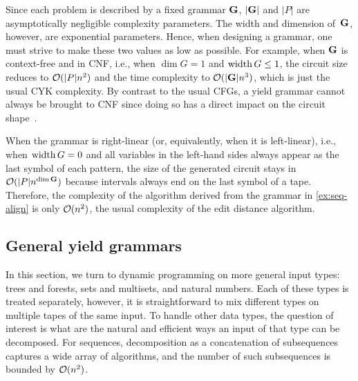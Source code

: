 Since each problem is described by a fixed grammar \(\gram\), \(|\gram|\) and \(|P|\) are asymptotically negligible complexity parameters.
The width and dimension of~\(\gram\), however, are exponential parameters.
Hence, when designing a grammar, one must strive to make these two values as low as possible.
For example, when \(\gram\) is context-free and in CNF, i.e., when \(\dim G = 1\) and \(\width G \le 1\),
the circuit size reduces to \(\bigo(|P| n^2)\)
and the time complexity to \(\bigo(|\gram| n^3)\),
which is just the usual CYK complexity.
By contrast to the usual CFGs, a yield grammar cannot always be brought to CNF since doing so has a direct impact on the circuit shape~\parencite[section~3.10]{Giegerich2004DisciplineDynamicProgramming}.

When the grammar is right-linear (or, equivalently, when it is left-linear), i.e.,
when \(\width G = 0\) and
all variables in the left-hand sides always appear as the last symbol of each pattern,
the size of the generated circuit stays in \(\bigo(|P|n^{\dim\gram})\)
because intervals always end on the last symbol of a tape.
Therefore, the complexity of the algorithm derived from the grammar in \cref{ex:seq-align} is only \(\bigo(n^2)\), the usual complexity of the edit distance algorithm.

\subsection{General yield grammars}

In this section, we turn to dynamic programming on more general input types: trees and forests, sets and multisets, and natural numbers.
Each of these types is treated separately, however, it is straightforward to mix different types on multiple tapes of the same input.
To handle other data types, the question of interest is what are the natural and efficient ways an input of that type can be decomposed.
For sequences, decomposition as a concatenation of subsequences captures a wide array of algorithms, and the number of such subsequences is bounded by \(\bigo(n^2)\).



